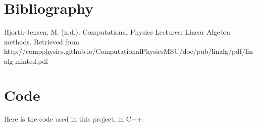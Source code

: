 \documentclass[11pt]{article}
\begin{document}
\section{Bibliography}
\begin{thebibliography}{widestlabel}
	Hjorth-Jensen, M. (n.d.). Computational Physics Lectures: Linear Algebra methods. Retrieved from http://compphysics.github.io/ComputationalPhysicsMSU/doc/pub/linalg/pdf/linalg-minted.pdf
\end{thebibliography}



\section{Code}
Here is the code used in this project, in C++:
\end{document}
